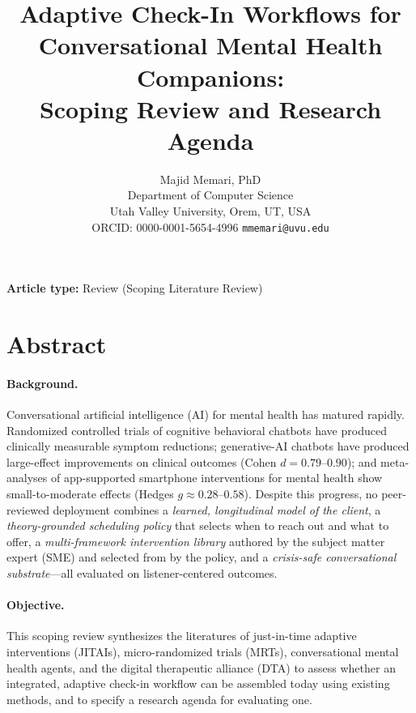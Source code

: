 \documentclass[11pt,a4paper]{article}
\title{Adaptive Check-In Workflows for Conversational
Mental Health Companions:\\Scoping Review and Research Agenda}
\author{Majid Memari, PhD\\
Department of Computer Science\\
Utah Valley University, Orem, UT, USA\\
ORCID: 0000-0001-5654-4996\quad
\texttt{mmemari@uvu.edu}}
\date{}
\begin{document}
\maketitle

\begin{flushleft}
\textbf{Article type:} Review (Scoping Literature Review)
\end{flushleft}

\section*{Abstract}

\paragraph{Background.}
Conversational artificial intelligence (AI) for mental health has
matured rapidly. Randomized controlled trials of cognitive behavioral
chatbots have produced clinically measurable symptom reductions;
generative-AI chatbots have produced large-effect improvements on
clinical outcomes (Cohen $d\!=\!0.79\text{--}0.90$); and
meta-analyses of app-supported smartphone interventions for mental
health show small-to-moderate effects (Hedges $g\!\approx\!0.28\text{--}0.58$).
Despite this progress, no peer-reviewed deployment combines a
\emph{learned, longitudinal model of the client}, a \emph{theory-grounded
scheduling policy} that selects when to reach out and what to offer, a
\emph{multi-framework intervention library} authored by the subject
matter expert (SME) and selected from by the policy, and a
\emph{crisis-safe conversational substrate}---all evaluated on
listener-centered outcomes.

\paragraph{Objective.}
This scoping review synthesizes the literatures of just-in-time
adaptive interventions (JITAIs), micro-randomized trials (MRTs),
conversational mental health agents, and the digital therapeutic
alliance (DTA) to assess whether an integrated, adaptive check-in
workflow can be assembled today using existing methods, and to
specify a research agenda for evaluating one.
\end{document}
